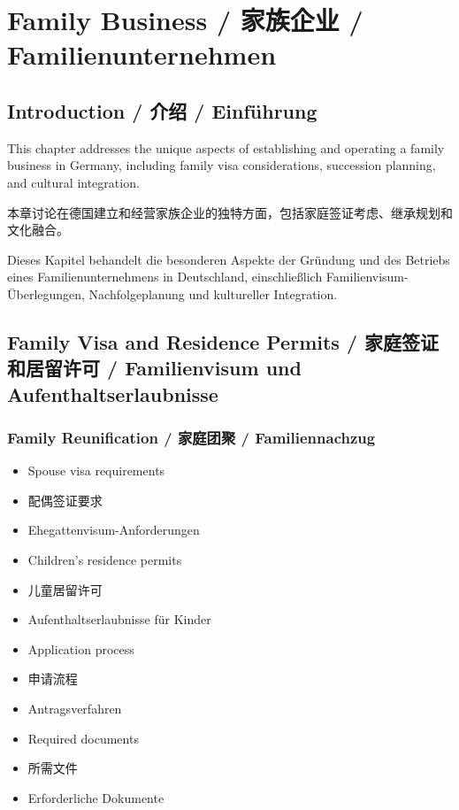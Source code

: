 \chapter{Family Business / 家族企业 / Familienunternehmen}

\section{Introduction / 介绍 / Einführung}

This chapter addresses the unique aspects of establishing and operating a family business in Germany, including family visa considerations, succession planning, and cultural integration.

本章讨论在德国建立和经营家族企业的独特方面，包括家庭签证考虑、继承规划和文化融合。

Dieses Kapitel behandelt die besonderen Aspekte der Gründung und des Betriebs eines Familienunternehmens in Deutschland, einschließlich Familienvisum-Überlegungen, Nachfolgeplanung und kultureller Integration.

\section{Family Visa and Residence Permits / 家庭签证和居留许可 / Familienvisum und Aufenthaltserlaubnisse}

\subsection{Family Reunification / 家庭团聚 / Familiennachzug}
\begin{itemize}
    \item Spouse visa requirements
    \item 配偶签证要求
    \item Ehegattenvisum-Anforderungen
    \item Children's residence permits
    \item 儿童居留许可
    \item Aufenthaltserlaubnisse für Kinder
    \item Application process
    \item 申请流程
    \item Antragsverfahren
    \item Required documents
    \item 所需文件
    \item Erforderliche Dokumente
\end{itemize}

